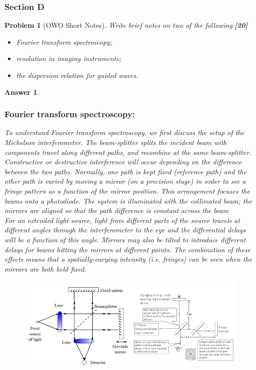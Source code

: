 \documentclass[a4paper]{article}
\newtheorem{ans}{Answer}[subsection]
\theoremstyle{new}
\newtheorem{qns}{Problem}[subsection]
\begin{document}
\subsubsection{Section D}
\begin{qns}[OWO Short Notes]
Write brief notes on two of the following:\hfill\textbf{[20]}
\begin{itemize}
    \item Fourier transform spectroscopy;
    \item resolution in imaging instruments;
    \item the dispersion relation for guided waves.
\end{itemize}
\end{qns}
\begin{ans}\leavevmode
\subsubsection*{Fourier transform spectroscopy:}
To understand Fourier transform spectroscopy, we first discuss the setup of the Michelson interferometer. The beam-splitter splits the incident beam with components travel along different paths, and recombine at the same beam-splitter. Constructive or destructive interference will occur depending on the difference between the two paths. Normally, one path is kept fixed (reference path) and the other path is varied by moving a mirror (on a precision stage) in order to see a fringe pattern as a function of the mirror position. This arrangement focuses the beams onto a photodiode. The system is illuminated with the collimated beam; the mirrors are aligned so that the path difference is constant across the beam\\[5pt]
For an extended light source, light from different parts of the source travels at different angles through the interferometer to the eye and the differential delays will be a function of this angle. Mirrors may also be tilted to introduce different delays for beams hitting the mirrors at different points. The combination of these effects means that a spatially-varying intensity (i.e. fringes) can be seen when the mirrors are both held fixed.
\begin{figure}[H]
    \centering
    \includegraphics[width=\linewidth]{mmi.PNG}

\end{figure}
\end{ans}
\end{document}
